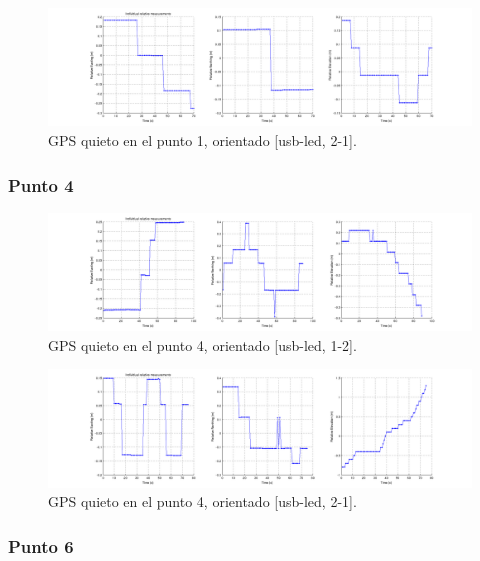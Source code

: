 \documentclass[spanish,12pt,a4paper,titlepage]{report}
\begin{document}
\begin{figure}[h!]
  \hspace{-70pt}
  \includegraphics[width=1.3\textwidth]{./img/log_10_individual.png}
  \caption{GPS quieto en el punto 1, orientado [usb-led, 2-1].}
  \label{fig:log_10_individual.png}
\end{figure}

\newpage
\subsubsection*{Punto 4}
\label{sec:punto-4}

\begin{figure}[h!]
  \hspace{-70pt}
  \includegraphics[width=1.3\textwidth]{./img/log_08_individual.png}
  \caption{GPS quieto en el punto 4, orientado [usb-led, 1-2].}
  \label{fig:log_08_individual.png}
\end{figure}

\begin{figure}[h!]
  \hspace{-70pt}
  \includegraphics[width=1.3\textwidth]{./img/log_07_individual.png}
  \caption{GPS quieto en el punto 4, orientado [usb-led, 2-1].}
  \label{fig:log_07_individual.png}
\end{figure}

\subsubsection*{Punto 6}
\label{sec:punto-6}
\end{document}
